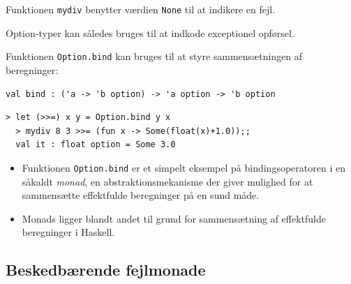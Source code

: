 \documentclass[rgb]{beamer}
\begin{document}
\begin{frame}[fragile]
\begin{footnotesize}

  Funktionen \lstinline{mydiv} benytter værdien \lstinline{None} til
  at indikere en fejl.

  \vspace{1ex}

  Option-typer kan således bruges til at indkode exceptionel opførsel.

  \vspace{1ex}

  Funktionen \lstinline{Option.bind} kan bruges til at styre
  sammensætningen af beregninger:

\begin{lstlisting}[numbers=none,frame=none,mathescape]
  val bind : ('a -> 'b option) -> 'a option -> 'b option
\end{lstlisting}


  \vspace{1ex}

\begin{lstlisting}[numbers=none,frame=none,mathescape]
  > let (>>=) x y = Option.bind y x
  > mydiv 8 3 >>= (fun x -> Some(float(x)+1.0));;
  val it : float option = Some 3.0
\end{lstlisting}


\begin{itemize}
\item Funktionen \lstinline{Option.bind} er et simpelt eksempel på
  bindingsoperatoren i en såkaldt \emph{monad}, en
  abstraktionsmekanisme der giver mulighed for at sammensætte
  effektfulde beregninger på en sund måde.
\item Monads ligger blandt andet til grund for sammensætning af
  effektfulde beregninger i Haskell.
\end{itemize}

\end{footnotesize}
\end{frame}

\subsection{Beskedbærende fejlmonade}
\end{document}
